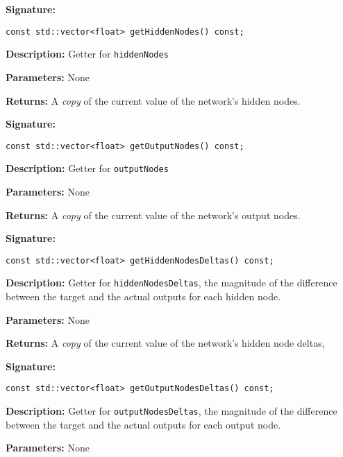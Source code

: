 \documentclass[a4paper]{article}
\begin{document}
\hrulefill %

\textbf{Signature:} \begin{lstlisting}
const std::vector<float> getHiddenNodes() const;
\end{lstlisting}

\textbf{Description: }
Getter for \lstinline{hiddenNodes}

\textbf{Parameters: } None

\textbf{Returns: }
A \textit{copy} of the current value of the network's hidden nodes.
\hrulefill %

\textbf{Signature:} \begin{lstlisting}
const std::vector<float> getOutputNodes() const;
\end{lstlisting}

\textbf{Description: }
Getter for \lstinline{outputNodes}

\textbf{Parameters: } None

\textbf{Returns: }
A \textit{copy} of the current value of the network's output nodes.

\hrulefill %

\textbf{Signature:} \begin{lstlisting}
const std::vector<float> getHiddenNodesDeltas() const;
\end{lstlisting}

\textbf{Description: }
Getter for \lstinline{hiddenNodesDeltas}, the magnitude of the difference between the target and the actual outputs for each hidden node.

\textbf{Parameters: } None

\textbf{Returns: }
A \textit{copy} of the current value of the network's hidden node deltas,

\hrulefill %

\textbf{Signature:} \begin{lstlisting}
const std::vector<float> getOutputNodesDeltas() const;
\end{lstlisting}

\textbf{Description: }
Getter for \lstinline{outputNodesDeltas}, the magnitude of the difference between the target and the actual outputs for each output node.

\textbf{Parameters: } None
\end{document}

